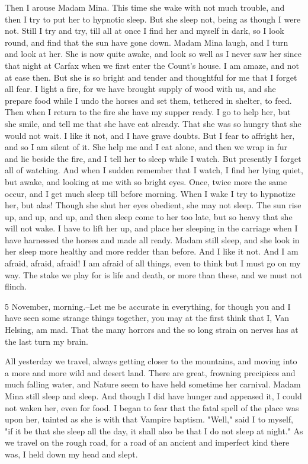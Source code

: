 Then I arouse Madam Mina. This time she wake with not much trouble, and then I try to put her to hypnotic sleep. But she sleep not, being as though I were not. Still I try and try, till all at once I find her and myself in dark, so I look round, and find that the sun have gone down. Madam Mina laugh, and I turn and look at her. She is now quite awake, and look so well as I never saw her since that night at Carfax when we first enter the Count's house. I am amaze, and not at ease then. But she is so bright and tender and thoughtful for me that I forget all fear. I light a fire, for we have brought supply of wood with us, and she prepare food while I undo the horses and set them, tethered in shelter, to feed. Then when I return to the fire she have my supper ready. I go to help her, but she smile, and tell me that she have eat already. That she was so hungry that she would not wait. I like it not, and I have grave doubts. But I fear to affright her, and so I am silent of it. She help me and I eat alone, and then we wrap in fur and lie beside the fire, and I tell her to sleep while I watch. But presently I forget all of watching. And when I sudden remember that I watch, I find her lying quiet, but awake, and looking at me with so bright eyes. Once, twice more the same occur, and I get much sleep till before morning. When I wake I try to hypnotize her, but alas! Though she shut her eyes obedient, she may not sleep. The sun rise up, and up, and up, and then sleep come to her too late, but so heavy that she will not wake. I have to lift her up, and place her sleeping in the carriage when I have harnessed the horses and made all ready. Madam still sleep, and she look in her sleep more healthy and more redder than before. And I like it not. And I am afraid, afraid, afraid! I am afraid of all things, even to think but I must go on my way. The stake we play for is life and death, or more than these, and we must not flinch. 

5 November, morning.--Let me be accurate in everything, for though you and I have seen some strange things together, you may at the first think that I, Van Helsing, am mad. That the many horrors and the so long strain on nerves has at the last turn my brain. 

All yesterday we travel, always getting closer to the mountains, and moving into a more and more wild and desert land. There are great, frowning precipices and much falling water, and Nature seem to have held sometime her carnival. Madam Mina still sleep and sleep. And though I did have hunger and appeased it, I could not waken her, even for food. I began to fear that the fatal spell of the place was upon her, tainted as she is with that Vampire baptism. "Well," said I to myself, "if it be that she sleep all the day, it shall also be that I do not sleep at night." As we travel on the rough road, for a road of an ancient and imperfect kind there was, I held down my head and slept. 

